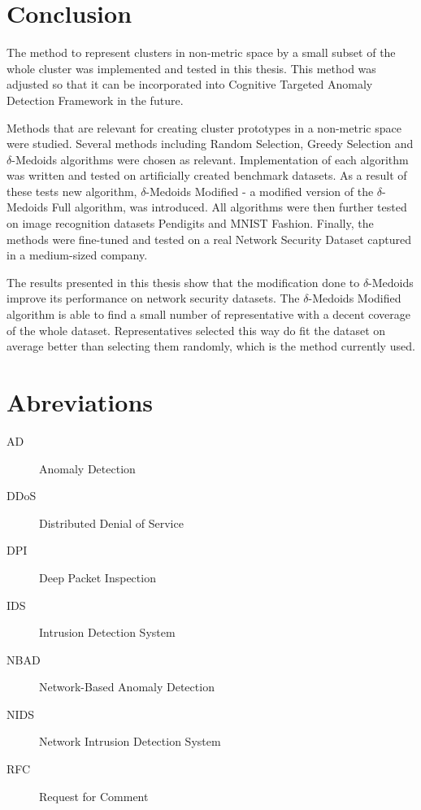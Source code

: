 \documentclass[thesis=B,english]{FITthesis}[2012/10/20]
\begin{document}


\chapter{Conclusion}

The method to represent clusters in non-metric space by a small subset of the whole cluster was implemented and tested in this thesis.
This method was adjusted so that it can be incorporated into Cognitive Targeted Anomaly Detection Framework in the future.

Methods that are relevant for creating cluster prototypes in a non-metric space were studied.
Several methods including Random Selection, Greedy Selection and $\delta$-Medoids algorithms were chosen as relevant.
Implementation of each algorithm was written and tested on artificially created benchmark datasets.
As a result of these tests new algorithm, $\delta$-Medoids Modified - a modified version of the $\delta$-Medoids Full algorithm, was introduced.
All algorithms were then further tested on image recognition datasets Pendigits and MNIST Fashion.
Finally, the methods were fine-tuned and tested on a real Network Security Dataset captured in a medium-sized company.

The results presented in this thesis show that the modification done to $\delta$-Medoids improve its performance on network security datasets.
The $\delta$-Medoids Modified algorithm is able to find a small number of representative with a decent coverage of the whole dataset.
Representatives selected this way do fit the dataset on average better than selecting them randomly, which is the method currently used.




\appendix

\chapter{Abreviations}
\begin{description}
    \item[AD] Anomaly Detection
    \item[DDoS] Distributed Denial of Service
    \item[DPI] Deep Packet Inspection
    \item[IDS] Intrusion Detection System
	\item[NBAD] Network-Based Anomaly Detection
	\item[NIDS] Network Intrusion Detection System
    \item[RFC] Request for Comment
\end{description}
\end{document}
